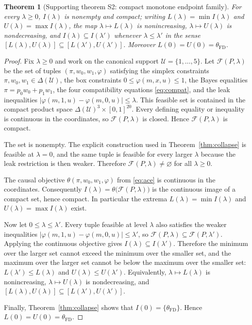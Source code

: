 \documentclass[11pt]{article}
\theoremstyle{definition}
\theoremstyle{plain}
\newtheorem{theorem}{Theorem}
\theoremstyle{remark}
\begin{document}
\begin{theorem}[Supporting theorem S2: compact monotone endpoint family]\label{thm:interval}
For every \(\lambda\ge0\), \(I(\lambda)\) is nonempty and compact; writing \(L(\lambda)=\min I(\lambda)\) and \(U(\lambda)=\max I(\lambda)\), the map \(\lambda\mapsto L(\lambda)\) is nonincreasing, \(\lambda\mapsto U(\lambda)\) is nondecreasing, and \(I(\lambda)\subseteq I(\lambda')\) whenever \(\lambda\le\lambda'\) in the sense \([L(\lambda),U(\lambda)]\subseteq[L(\lambda'),U(\lambda')]\). Moreover \(L(0)=U(0)=\theta_{\mathrm{FD}}\).
\end{theorem}
\begin{proof}
Fix \(\lambda\ge0\) and work on the canonical support \(\mathcal U=\{1,\dots,5\}\). Let \(\mathcal F(P,\lambda)\) be the set of tuples \((\pi,w_0,w_1,\varphi)\) satisfying the simplex constraints \(\pi,w_0,w_1\in\Delta(\mathcal U)\), the box constraints \(0\le \varphi(m,x,u)\le 1\), the Bayes equalities \(\pi=p_0w_0+p_1w_1\), the four compatibility equations \eqref{eq:compat}, and the leak inequalities \(|\varphi(m,1,u)-\varphi(m,0,u)|\le \lambda\). This feasible set is contained in the compact product space \(\Delta(\mathcal U)^3\times[0,1]^{20}\). Every defining equality or inequality is continuous in the coordinates, so \(\mathcal F(P,\lambda)\) is closed. Hence \(\mathcal F(P,\lambda)\) is compact.

The set is nonempty. The explicit construction used in Theorem~\ref{thm:collapse} is feasible at \(\lambda=0\), and the same tuple is feasible for every larger \(\lambda\) because the leak restriction is then weaker. Therefore \(\mathcal F(P,\lambda)\neq\varnothing\) for all \(\lambda\ge0\).

The causal objective \(\theta(\pi,w_0,w_1,\varphi)\) from \eqref{eq:ace} is continuous in the coordinates. Consequently \(I(\lambda)=\theta\bigl(\mathcal F(P,\lambda)\bigr)\) is the continuous image of a compact set, hence compact. In particular the extrema \(L(\lambda)=\min I(\lambda)\) and \(U(\lambda)=\max I(\lambda)\) exist.

Now let \(0\le \lambda\le \lambda'\). Every tuple feasible at level \(\lambda\) also satisfies the weaker inequalities \(|\varphi(m,1,u)-\varphi(m,0,u)|\le \lambda'\), so \(\mathcal F(P,\lambda)\subseteq \mathcal F(P,\lambda')\). Applying the continuous objective gives \(I(\lambda)\subseteq I(\lambda')\). Therefore the minimum over the larger set cannot exceed the minimum over the smaller set, and the maximum over the larger set cannot be below the maximum over the smaller set: \(L(\lambda')\le L(\lambda)\) and \(U(\lambda)\le U(\lambda')\). Equivalently, \(\lambda\mapsto L(\lambda)\) is nonincreasing, \(\lambda\mapsto U(\lambda)\) is nondecreasing, and \([L(\lambda),U(\lambda)]\subseteq [L(\lambda'),U(\lambda')]\).

Finally, Theorem~\ref{thm:collapse} shows that \(I(0)=\{\theta_{\mathrm{FD}}\}\). Hence \(L(0)=U(0)=\theta_{\mathrm{FD}}\).
\end{proof}
\end{document}
